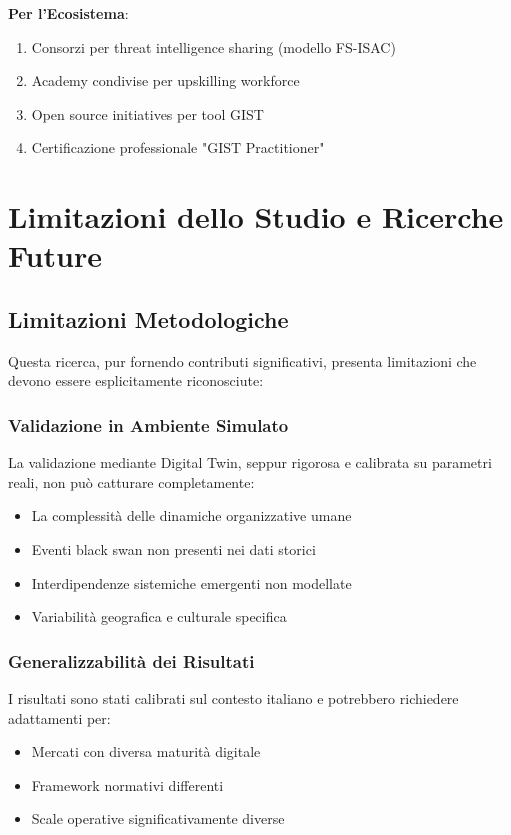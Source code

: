 \textbf{Per l'Ecosistema}:
\begin{enumerate}
\item Consorzi per threat intelligence sharing (modello FS-ISAC)
\item Academy condivise per upskilling workforce
\item Open source initiatives per tool GIST
\item Certificazione professionale "GIST Practitioner"
\end{enumerate}

\section{Limitazioni dello Studio e Ricerche Future}

\subsection{Limitazioni Metodologiche}

Questa ricerca, pur fornendo contributi significativi, presenta limitazioni che devono essere esplicitamente riconosciute:

\subsubsection{Validazione in Ambiente Simulato}
La validazione mediante Digital Twin, seppur rigorosa e calibrata su parametri reali, non può catturare completamente:
\begin{itemize}
\item La complessità delle dinamiche organizzative umane
\item Eventi black swan non presenti nei dati storici
\item Interdipendenze sistemiche emergenti non modellate
\item Variabilità geografica e culturale specifica
\end{itemize}

\subsubsection{Generalizzabilità dei Risultati}
I risultati sono stati calibrati sul contesto italiano e potrebbero richiedere adattamenti per:
\begin{itemize}
\item Mercati con diversa maturità digitale
\item Framework normativi differenti
\item Scale operative significativamente diverse
\end{itemize}

